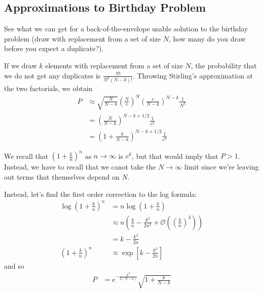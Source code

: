 \documentclass[12pt]{report}
\begin{document}

\subsection{Approximations to Birthday Problem}

See what we can get for a back-of-the-envelope usable solution to the birthday
problem (draw with replacement from a set of size $N$, how many do you draw
before you expect a duplicate?).

If we draw $k$ elements with replacement from a set of size $N$, the probability
that we do not get any duplicates is $\frac{N!}{N^k(N - k)!}$. Throwing
Stirling's approximation at the two factorials, we obtain
\begin{align}
    P
        &\approx \sqrt{\frac{N}{N-k}}\left( \frac{N}{e} \right)^N
            \left( \frac{e}{N - k} \right)^{N - k} \frac{1}{N^k} \nonumber\\
        &= \left( \frac{N}{N - k} \right)^{N - k + 1/2}\frac{1}{e^k}
            \nonumber\\
        &= \left( 1 + \frac{k}{N - k} \right)^{N - k + 1/2}\frac{1}{e^k}
            \nonumber
\end{align}

We recall that $\left( 1 + \frac{k}{n} \right)^n$ as $n \to \infty$ is $e^k$,
but that would imply that $P > 1$. Instead, we have to recall that we canot take
the $N \to \infty$ limit since we're leaving out terms that themselves depend on
$N$.

Instead, let's find the first order correction to the log formula:
\begin{align}
    \log \left( 1 + \frac{k}{n} \right)^{n}
        \nonumber
        &= n\log \left( 1 + \frac{k}{n} \right)\\
        \nonumber
        &\approx n \left( \frac{k}{n} - \frac{k^2}{2n^2} + \mathcal{O}
            \left( \left(\frac{k}{n}\right)^3 \right)
        \right)\\
        \nonumber
        &= k - \frac{k^2}{2n}\\
    \left( 1 + \frac{k}{n} \right)^n &\approx \exp \left[
        k - \frac{k^2}{2n}\label{eq:e_approx}
    \right]
\end{align}
and so
\begin{align}
    P
        &= e^{-\frac{k^2}{2(N - k)}}\sqrt{1 + \frac{k}{N - k}}
\end{align}
\end{document}
